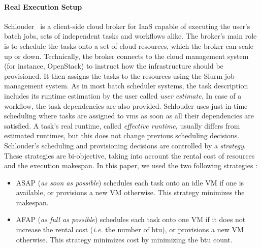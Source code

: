 \documentclass[]{llncs}
\begin{document}
\paragraph{Real Execution Setup}
Schlouder~\cite{Michon17} is a client-side cloud broker for IaaS capable of
executing the  user's batch jobs, sets of independent tasks and workflows alike.
The broker's main role is  to schedule the tasks onto a set of cloud resources, 
which the broker can scale up  or down.
Technically, the broker  connects to the cloud management  system (for instance,
OpenStack) to  instruct how  the infrastructure should  be provisioned. It then
assigns the tasks to the resources using the Slurm job management system.
%
As in  most batch scheduler systems,  the task description includes  its runtime
estimation by the user called \emph{user  estimate}.  In case of a workflow, the
task  dependencies are  also provided.   Schlouder uses  just-in-time scheduling
where  tasks are  assigned to  \acp{vm} as  soon as  all their  dependencies are
satisfied.  A  task's real  runtime,  called  \emph{effective runtime},  usually
differs from  estimated runtimes, but  this does not change  previous scheduling
decisions. Schlouder's scheduling and provisioning  decisions are controlled by a
\emph{strategy}.  These strategies  are  bi-objective, taking  into account  the
rental cost of resources and the execution  makespan. In this paper, we used the
two following strategies :
\begin{itemize}
\item ASAP (\textit{as soon as possible}) schedules each task onto
  an idle VM if one is available, or provisions a new VM otherwise.
  This strategy minimizes the makespan.

\item AFAP (\textit{as full as  possible}) schedules each task onto
  one VM if it does not increase the rental cost (\textit{i.e.} the number
  of \ac{btu}), or provisions a new VM otherwise. This strategy minimizes cost
  by minimizing the \ac{btu} count.
\end{itemize}
\end{document}
